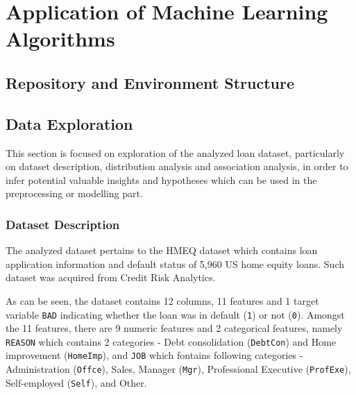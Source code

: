 \chapter{Application of Machine Learning Algorithms}
\label{chap:four}

\section{Repository and Environment Structure}
\section{Data Exploration}
This section is focused on exploration of the analyzed loan dataset, particularly on dataset description, distribution analysis and association analysis, in order to infer potential valuable insights and hypotheses which can be used in the preprocessing or modelling part.

\subsection{Dataset Description}
The analyzed dataset pertains to the HMEQ dataset which contains loan application information and default status of 5,960 US home equity loans. Such dataset was acquired from Credit Risk Analytics.

As can be seen, the dataset contains 12 columns, 11 features and 1 target variable \texttt{BAD} indicating whether the loan was in default (\texttt{1}) or not (\texttt{0}). 
Amongst the 11 features, there are 9 numeric features and 2 categorical features, namely \texttt{REASON} which contains 2 categories - Debt consolidation (\texttt{DebtCon}) and Home improvement (\texttt{HomeImp}), and \texttt{JOB} which fontains following categories - Administration (\texttt{Offce}), Sales, Manager (\texttt{Mgr}), Professional Executive (\texttt{ProfExe}), Self-employed (\texttt{Self}), and Other.


